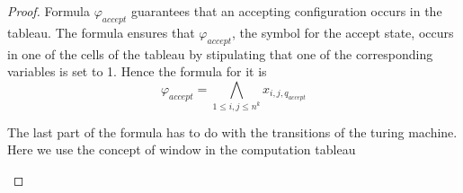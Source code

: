 \documentclass{article}
\begin{document}
\begin{proof}
	Formula \(\varphi_{accept}\) guarantees that an accepting configuration occurs in the tableau. The formula ensures that \(\varphi_{accept}\), the symbol for the accept state, occurs in one of the cells of the tableau by stipulating that one of the corresponding variables is set to 1. Hence the formula for it is \[\varphi_{accept}=\bigwedge_{1\leq i,j\leq n^k} x_{i,j,q_{accept}}\]
	
	The last part of the formula has to do with the transitions of the turing machine. Here we use the concept of window in the computation tableau
	
\begin{center}
\end{center}
\end{proof}
\end{document}
